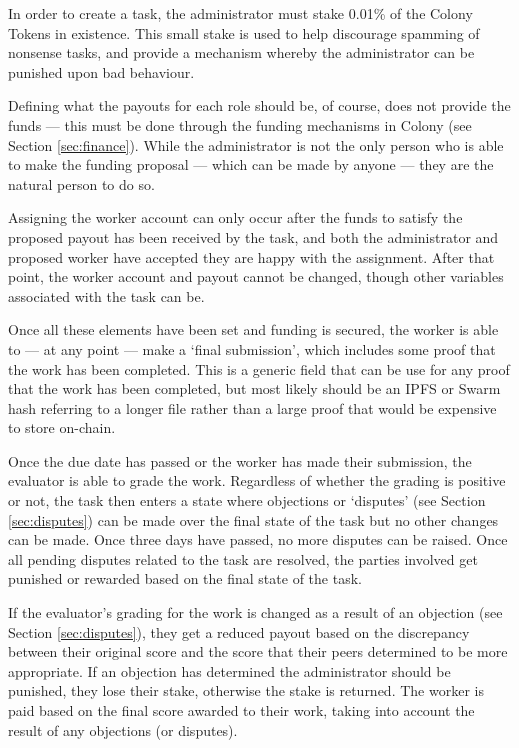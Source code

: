 In order to create a task, the administrator must stake 0.01\% of the Colony Tokens in existence. This small stake is used to help discourage spamming of nonsense tasks, and provide a mechanism whereby the administrator can be punished upon bad behaviour. 

Defining what the payouts for each role should be, of course, does not provide the funds --- this must be done through the funding mechanisms in Colony (see Section \ref{sec:finance}). While the administrator is not the only person who is able to make the funding proposal --- which can be made by anyone --- they are the natural person to do so.

Assigning the worker account can only occur after the funds to satisfy the proposed payout has been received by the task, and both the administrator and proposed worker have accepted they are happy with the assignment. After that point, the worker account and payout cannot be changed, though other variables associated with the task can be.

Once all these elements have been set and funding is secured, the worker is able to --- at any point --- make a `final submission', which includes some proof that the work has been completed. This is a generic field that can be use for any proof that the work has been completed, but most likely should be an IPFS or Swarm hash referring to a longer file rather than a large proof that would be expensive to store on-chain.

Once the due date has passed or the worker has made their submission, the evaluator is able to grade the work. Regardless of whether the grading is positive or not, the task then enters a state where objections or `disputes' (see Section \ref{sec:disputes}) can be made over the final state of the task but no other changes can be made. Once three days have passed, no more disputes can be raised. Once all pending disputes related to the task are resolved, the parties involved get punished or rewarded based on the final state of the task.

If the evaluator's grading for the work is changed as a result of an objection (see Section \ref{sec:disputes}), they get a reduced payout based on the discrepancy between their original score and the score that their peers determined to be more appropriate. If an objection has determined the administrator should be punished, they lose their stake, otherwise the stake is returned. The worker is paid based on the final score awarded to their work, taking into account the result of any objections (or disputes).

